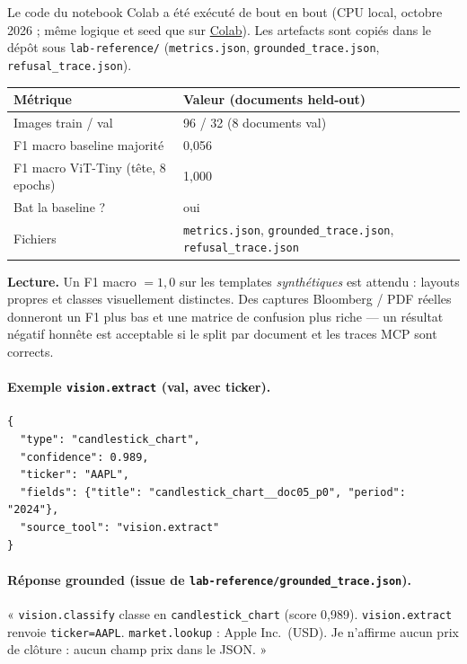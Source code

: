 \documentclass[11pt,a4paper]{article}
\begin{document}
Le code du notebook Colab a été exécuté de bout en bout (CPU local, octobre 2026 ;
même logique et seed que sur
\href{https://colab.research.google.com/github/Amzil-AI/Vision-desk/blob/main/vision_desk_colab.ipynb}{Colab}).
Les artefacts sont copiés dans le dépôt sous \texttt{lab-reference/}
(\texttt{metrics.json}, \texttt{grounded\_trace.json}, \texttt{refusal\_trace.json}).

\begin{center}
\renewcommand{\arraystretch}{1.15}
\begin{tabular}{@{}p{4.2cm}p{10.4cm}@{}}
\toprule
\textbf{Métrique} & \textbf{Valeur (documents held-out)} \\
\midrule
Images train / val & 96 / 32 (8 documents val) \\
F1 macro baseline majorité & 0{,}056 \\
F1 macro ViT-Tiny (tête, 8 epochs) & 1{,}000 \\
Bat la baseline ? & oui \\
Fichiers & \texttt{metrics.json}, \texttt{grounded\_trace.json}, \texttt{refusal\_trace.json} \\
\bottomrule
\end{tabular}
\end{center}

{\color{warn}\textbf{Lecture.}
Un F1 macro $=1{,}0$ sur les templates \emph{synthétiques} est attendu : layouts
propres et classes visuellement distinctes. Des captures Bloomberg / PDF réelles
donneront un F1 plus bas et une matrice de confusion plus riche --- un résultat
négatif honnête est acceptable si le split par document et les traces MCP sont
corrects.}

\paragraph{Exemple \texttt{vision.extract} (val, avec ticker).}
\begin{verbatim}
{
  "type": "candlestick_chart",
  "confidence": 0.989,
  "ticker": "AAPL",
  "fields": {"title": "candlestick_chart__doc05_p0", "period": "2024"},
  "source_tool": "vision.extract"
}
\end{verbatim}

\paragraph{Réponse grounded (issue de \texttt{lab-reference/grounded\_trace.json}).}
« \texttt{vision.classify} classe en \texttt{candlestick\_chart} (score 0{,}989).
\texttt{vision.extract} renvoie \texttt{ticker=AAPL}. \texttt{market.lookup} :
Apple Inc.\ (USD). Je n'affirme aucun prix de clôture : aucun champ prix dans le JSON. »
\end{document}
